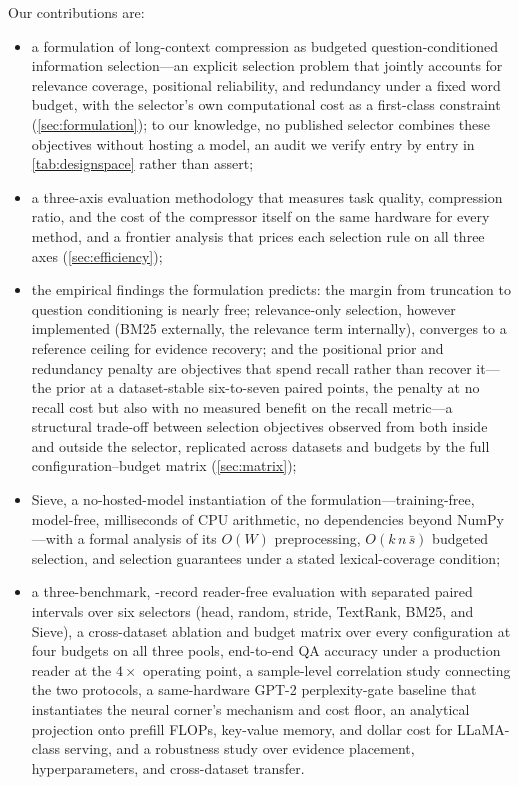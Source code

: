 \documentclass[pdflatex,sn-basic]{sn-jnl}
\theoremstyle{remark}
\newcommand{\method}{Sieve}
\begin{document}
Our contributions are:
\begin{itemize}
\item a formulation of long-context compression as budgeted
question-conditioned information selection---an explicit
selection problem that jointly accounts for relevance coverage,
positional reliability, and redundancy under a fixed word budget, with
the selector's own computational cost as a first-class constraint
(\autoref{sec:formulation}); to our knowledge, no published selector
combines these objectives without hosting a model, an audit we
verify entry by entry in \autoref{tab:designspace} rather than assert;
\item a three-axis evaluation methodology that measures task quality,
compression ratio, and the cost of the compressor itself on the same
hardware for every method, and a frontier analysis that prices each
selection rule on all three axes
(\autoref{sec:efficiency});
\item the empirical findings the formulation predicts: the margin from
truncation to question conditioning is nearly free; relevance-only
selection, however implemented (BM25 externally, the relevance term
internally), converges to a reference ceiling for evidence recovery;
and the positional prior and redundancy penalty are objectives that
spend recall rather than recover it---the prior at a dataset-stable
six-to-seven paired points, the penalty at no recall cost but also
with no measured benefit on the recall metric---a structural trade-off
between selection objectives observed from both inside and outside the
selector, replicated across datasets and budgets by the full
configuration--budget matrix (\autoref{sec:matrix});
\item \method{}, a no-hosted-model instantiation of the
formulation---training-free, model-free, milliseconds of CPU
arithmetic, no dependencies beyond NumPy---with a formal analysis of
its $O(W)$ preprocessing, $O(k\,n\,\bar{s})$ budgeted selection, and
selection guarantees under a stated lexical-coverage condition;
\item a three-benchmark, \TotalRecords{}-record reader-free evaluation
with separated paired intervals over six selectors (head, random,
stride, TextRank, BM25, and \method{}), a cross-dataset ablation and
budget matrix over every configuration at four budgets on all three
pools, end-to-end QA accuracy under a
production reader at the $4\times$ operating point, a sample-level
correlation study connecting the two protocols, a same-hardware GPT-2
perplexity-gate baseline that instantiates the neural corner's
mechanism and cost floor, an analytical projection onto prefill FLOPs,
key-value memory, and dollar cost for LLaMA-class serving, and a
robustness study over evidence placement, hyperparameters, and
cross-dataset transfer.
\end{itemize}
\end{document}
